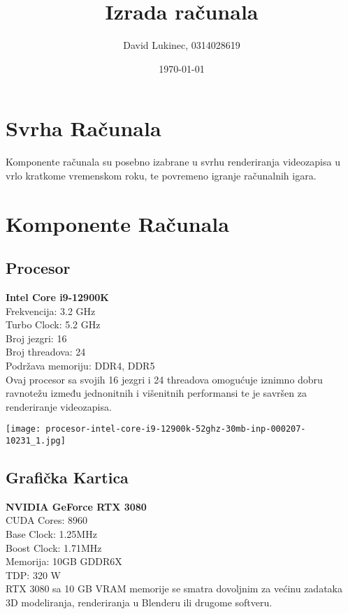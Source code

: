 \documentclass{article}
\title{Izrada računala}
\author{David Lukinec, 0314028619}
\date{\today}
\begin{document}
\maketitle

\section{Svrha Računala}
Komponente računala su posebno izabrane u svrhu renderiranja videozapisa u vrlo kratkome vremenskom roku, te povremeno igranje računalnih igara.

\section{Komponente Računala}

\subsection{Procesor}
\textbf{Intel Core i9-12900K}\\
Frekvencija: 3.2 GHz\\
Turbo Clock: 5.2 GHz\\
Broj jezgri: 16\\
Broj threadova: 24\\
Podržava memoriju: DDR4, DDR5\\

Ovaj procesor sa svojih 16 jezgri i 24 threadova omogućuje iznimno dobru ravnotežu između jednonitnih i višenitnih performansi te je savršen za renderiranje videozapisa.

\begin{center}
    \texttt{[image: procesor-intel-core-i9-12900k-52ghz-30mb-inp-000207-10231\_1.jpg]}
\end{center}


\subsection{Grafička Kartica}

\textbf{NVIDIA GeForce RTX 3080}\\
CUDA Cores: 8960\\
Base Clock: 1.25MHz\\
Boost Clock: 1.71MHz\\
Memorija: 10GB GDDR6X\\
TDP: 320 W\\

RTX 3080 sa 10 GB VRAM memorije se smatra dovoljnim za većinu zadataka 3D modeliranja, renderiranja u Blenderu ili drugome softveru.
\end{document}

